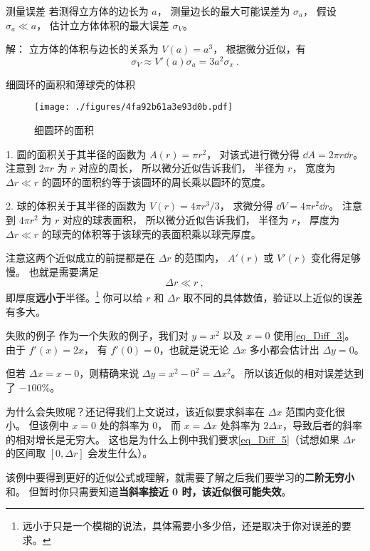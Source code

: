 \begin{example}{测量误差}\label{ex_Diff_1}
若测得立方体的边长为 $a$， 测量边长的最大可能误差为 $\sigma_a$， 假设 $\sigma_a \ll a$， 估计立方体体积的最大误差 $\sigma_V$。

解： 立方体的体积与边长的关系为 $V(a)=a^3$， 根据微分近似，有
\begin{equation}
\sigma_V \approx V'(a) \sigma_a = 3a^2 \sigma_x~.
\end{equation}
\end{example}

\begin{example}{细圆环的面积和薄球壳的体积}\label{ex_Diff_2}
\begin{figure}[ht]
\centering
\texttt{[image: ./figures/4fa92b61a3e93d0b.pdf]}
\caption{细圆环的面积} \label{fig_Diff_2}
\end{figure}

1. 圆的面积关于其半径的函数为 $A(r) = \pi r^2$， 对该式进行微分得 $\dd{A} = 2\pi r\dd{r}$。 注意到 $2\pi r$ 为 $r$ 对应的周长， 所以微分近似告诉我们， 半径为 $r$， 宽度为 $\Delta r \ll r$ 的圆环的面积约等于该圆环的周长乘以圆环的宽度。

2. 球的体积关于其半径的函数为 $V(r) = 4\pi r^3/3$， 求微分得 $\dd{V} = 4\pi r^2 \dd{r}$。 注意到 $4\pi r^2$ 为 $r$ 对应的球表面积， 所以微分近似告诉我们， 半径为 $r$， 厚度为 $\Delta r \ll r$ 的球壳的体积等于该球壳的表面积乘以球壳厚度。

注意这两个近似成立的前提都是在 $\Delta r$ 的范围内， $A'(r)$ 或 $V'(r)$ 变化得足够慢。 也就是需要满足
\begin{equation}\label{eq_Diff_5}
\Delta r \ll r~,
\end{equation}
即厚度\textbf{远小于}半径。\footnote{远小于只是一个模糊的说法，具体需要小多少倍，还是取决于你对误差的要求。} 你可以给 $r$ 和 $\Delta r$ 取不同的具体数值，验证以上近似的误差有多大。
\end{example}

\begin{example}{失败的例子}
作为一个失败的例子，我们对 $y = x^2$ 以及 $x=0$ 使用\autoref{eq_Diff_3}。 由于 $f'(x) = 2x$， 有 $f'(0) = 0$，也就是说无论 $\Delta x$ 多小都会估计出 $\Delta y = 0$。

但若 $\Delta x = x - 0$，则精确来说 $\Delta y = x^2 - 0^2 = \Delta x^2$。 所以该近似的相对误差达到了 $-100\%$。

为什么会失败呢？还记得我们上文说过，该近似要求斜率在 $\Delta x$ 范围内变化很小。 但该例中 $x=0$ 处的斜率为 0， 而 $x=\Delta x$ 处斜率为 $2\Delta x$，导致后者的斜率的相对增长是无穷大。 这也是为什么上例中我们要求\autoref{eq_Diff_5}（试想如果 $\Delta r$ 的区间取 $[0, \Delta r]$ 会发生什么）。
\end{example}

该例中要得到更好的近似公式或理解，就需要了解之后我们要学习的\textbf{二阶无穷小}和。 但暂时你只需要知道\textbf{当斜率接近 0 时，该近似很可能失效}。
